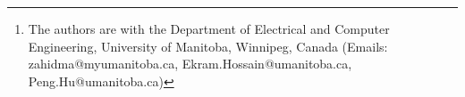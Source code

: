 \documentclass[journal]{IEEEtran}
\begin{document}
% 











\author{Muhammad Adeel Zahid, Ekram~Hossain,~, and Peng~Hu,~\thanks{The authors are with the
Department of Electrical and Computer Engineering,
University of Manitoba, Winnipeg, Canada 
(Emails: zahidma@myumanitoba.ca, Ekram.Hossain@umanitoba.ca, Peng.Hu@umanitoba.ca)}
}
\maketitle
\end{document}

